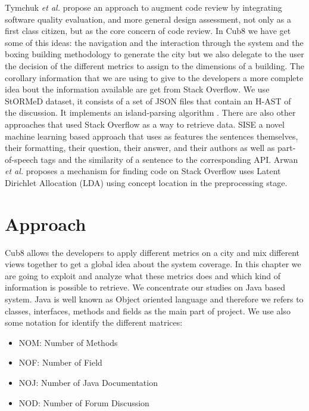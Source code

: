 \documentclass[]{usiinfbachelorproject}
\newcommand {\stormed}[0]{StORMeD\xspace}
\newcommand {\etal}[0]{\emph{et al.\xspace}}
\begin{document}
Tymchuk \etal \cite{VVV} propose an approach to augment code review by integrating software quality evaluation, and more general design assessment, not only as a first class citizen, but as the core concern of code review.
In Cub8 we have  get some of this ideas: the navigation and the interaction through the system and the boxing building methodology to generate the city but we also delegate to the user the decision of  the different metrics to assign to the dimensions of a building.  
The corollary information that we are using to give to the developers a more complete idea bout the information available are get from Stack Overflow. We use \stormed dataset, it consists of a set of JSON files that contain an H-AST of the discussion. It implements an island-parsing algorithm \cite{stormy}. There are also other approaches that used Stack Overflow as a  way to retrieve data.
SISE \cite{SISE}  a novel machine learning based approach that uses as features the sentences themselves, their formatting, their question, their answer, and their authors as well as part-of-speech tags and the similarity of a sentence to the corresponding API.
Arwan \etal \cite{7231439}  proposes a mechanism for finding code on Stack Overflow uses Latent Dirichlet Allocation (LDA) using concept location in the preprocessing stage. 
 


\newpage
\section{Approach} \label{approach}

Cub8 allows the developers to apply different metrics on a city and  mix different views together to get a global idea about the system coverage. In this chapter we are going to exploit and analyze what these metrics does and which kind of information is possible to retrieve. 
We concentrate our studies on Java based system. Java is well known as Object oriented language and therefore we refers to classes, interfaces, methods and fields as the main part of project.
We use also some notation for identify the different matrices: 
\begin{itemize}
\item NOM: Number of Methods
\item NOF: Number of Field
\item NOJ: Number of Java Documentation
\item NOD: Number of Forum Discussion

\end{itemize} 
\end{document}
